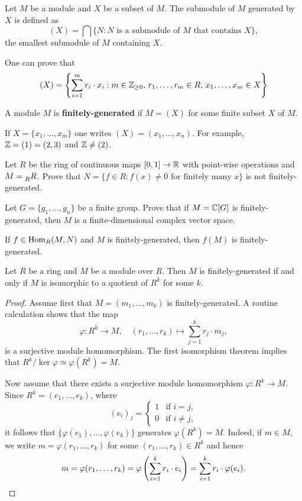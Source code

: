 \lecture{}

\begin{definition}
Let $M$ be a module and $X$ be a subset of $M$. The submodule
of $M$ generated by $X$ is defined as
\[
(X)=\bigcap\{N:N\text{ is a submodule of $M$ that contains $X$}\},
\]
the smallest submodule of $M$ containing $X$. 
\end{definition}

One can prove that  
\[
(X)=\left\{\sum_{i=1}^mr_i\cdot x_i:m\in\mathbb{Z}_{\geq0},\,r_1,\dots,r_m\in R,\,x_1,\dots,x_m\in X\right\}
\]

\begin{definition}
A module $M$ is \textbf{finitely-generated} if $M=(X)$ for some finite subset $X$ of $M$.
\end{definition}

If $X=\{x_1,\dots,x_m\}$ one writes $(X)=(x_1,\dots,x_n)$.
For example, $\mathbb{Z}=(1)=(2,3)$ and $\mathbb{Z}\ne (2)$.

\begin{exercise}
    Let $R$ be the ring of continuous maps $[0,1]\to\mathbb{R}$ with point-wise operations and 
    $M=\prescript{}{R}{R}$. Prove that
    $N=\{f\in R:f(x)\ne0\text{ for finitely many $x$}\}$ is not finitely-generated. 
\end{exercise}

\begin{exercise}
    Let $G=\{g_1,\dots,g_n\}$ be a finite group. Prove that if $M=\mathbb{C}[G]$ is finitely-generated, then
    $M$ is a finite-dimensional complex vector space. 
\end{exercise}

If $f\in\operatorname{Hom}_R(M,N)$ and $M$ is finitely-generated, then 
$f(M)$ is finitely-generated. 

\begin{proposition}
    Let $R$ be a ring and $M$ be a module over $R$. 
    Then $M$ is finitely-generated if and only if $M$ is isomorphic to a quotient of $R^k$ for some $k$.
\end{proposition}

\begin{proof}
    Assume first that $M=(m_1,\dots,m_k)$ is finitely-generated. A routine calculation shows that
    the map
    \[
    \varphi\colon R^k\to M,\quad
    (r_1,\dots,r_k)\mapsto \sum_{j=1}^kr_j\cdot m_j,
    \]
    is a surjective module homomorphism. The first isomorphism theorem implies that 
    $R^k/\ker\varphi\simeq\varphi(R^k)=M$. 
    
    Now assume that there exists a 
    surjective module homomorphism $\varphi\colon R^k\to M$. Since 
    $R^k=(e_1,\dots,e_k)$, where 
    \[
    (e_i)_j=\begin{cases}
    1 & \text{if $i=j$},\\
    0 & \text{if $i\ne j$},
    \end{cases}
    \]
    it follows that $\{\varphi(e_1),\dots,\varphi(e_k)\}$ generates $\varphi(R^k)=M$. Indeed, 
    if $m\in M$, we write $m=\varphi(r_1,\dots,r_k)$ for some $(r_1,\dots,r_k)\in R^k$ 
    and hence 
    \[
    m=\varphi(r_1,\dots,r_k)=\varphi\left(\sum_{i=1}^k r_i\cdot e_i\right)
    =\sum_{i=1}^kr_i\cdot\varphi(e_i).\qedhere
    \]
\end{proof}

